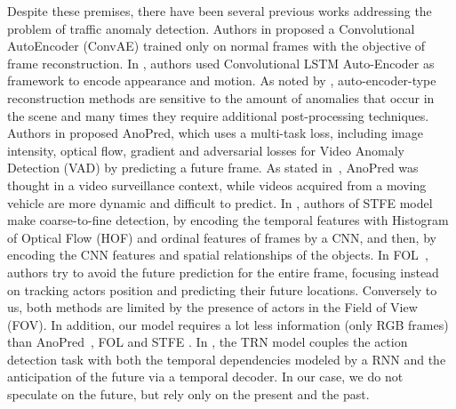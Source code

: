 Despite these premises, there have been several previous works addressing the problem of traffic anomaly detection.
Authors in \cite{hasan2016learning} proposed a Convolutional AutoEncoder (ConvAE) trained only on normal frames with the objective of frame reconstruction.
In \cite{luo2017remembering, wang2018abnormal}, authors used Convolutional LSTM Auto-Encoder as framework to encode appearance and motion.
As noted by \cite{ramachandra2020survey}, auto-encoder-type reconstruction methods are sensitive to the amount of anomalies that occur in the scene and many times they require additional post-processing techniques.
Authors in \cite{liu2018future} proposed AnoPred, which uses a multi-task loss, including image intensity, optical flow, gradient and adversarial losses for Video Anomaly Detection (VAD) by predicting a future frame.
As stated in~\cite{9712446}, AnoPred was thought in a video surveillance context, while videos acquired from a moving vehicle are more dynamic and difficult to predict.
In \cite{zhou_spatio-temporal_2022}, authors of STFE model make coarse-to-fine detection, by encoding the temporal features with Histogram of Optical Flow (HOF) \cite{wang2013action} and ordinal features of frames by a CNN, and then, by encoding the CNN features and spatial relationships of the objects.
In FOL~\cite{9712446}, authors try to avoid the future prediction for the entire frame, focusing instead on tracking actors position and predicting their future locations.
Conversely to us, both methods are limited by the presence of actors in the Field of View (FOV).
In addition, our model requires a lot less information (only RGB frames) than AnoPred~\cite{liu2018future}, FOL \cite{9712446} and STFE \cite{zhou_spatio-temporal_2022}.
In \cite{xu2019temporal}, the TRN model couples the action detection task with both the temporal dependencies modeled by a RNN and the anticipation of the future via a temporal decoder.
In our case, we do not speculate on the future, but rely only on the present and the past.

